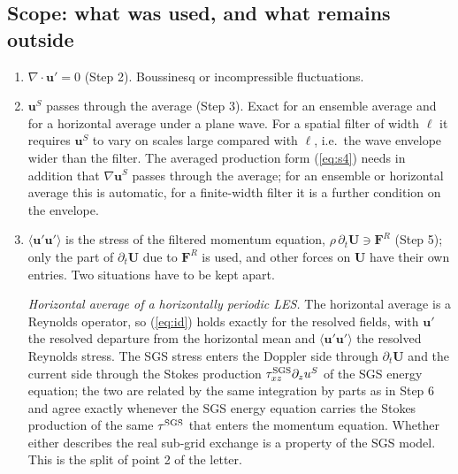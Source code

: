 \documentclass[10pt]{article}
\newcommand{\av}[1]{\langle #1\rangle}\newcommand{\uS}{\bm u^S}\newcommand{\WS}{\mathcal W_S}\newcommand{\PS}{\mathcal P_S}
\newcommand{\bu}{\bm u}\newcommand{\bU}{\bm U}\newcommand{\bxi}{\bm\xi}\newcommand{\dd}{\mathrm d}
\begin{document}
\subsection{Scope: what was used, and what remains outside}\label{sec:scope}
\begin{enumerate}[leftmargin=1.6em,itemsep=1pt,topsep=1pt]
\item $\nabla\cdot\bu'=0$ (Step 2). Boussinesq or incompressible fluctuations.
\item $\uS$ passes through the average (Step 3). Exact for an ensemble average and for a horizontal average under a plane wave. For a spatial filter of width $\ell$ it requires $\uS$ to vary on scales large compared with $\ell$, i.e.\ the wave envelope wider than the filter. The averaged production form (\ref{eq:s4}) needs in addition that $\nabla\uS$ passes through the average; for an ensemble or horizontal average this is automatic, for a finite-width filter it is a further condition on the envelope.
\item $\av{\bu'\bu'}$ is the stress of the filtered momentum equation, $\rho\,\partial_t\bU\ni\bm F^R$ (Step 5); only the part of $\partial_t\bU$ due to $\bm F^R$ is used, and other forces on $\bU$ have their own entries. Two situations have to be kept apart.

\emph{Horizontal average of a horizontally periodic LES.} The horizontal average is a Reynolds operator, so (\ref{eq:id}) holds exactly for the resolved fields, with $\bu'$ the resolved departure from the horizontal mean and $\av{\bu'\bu'}$ the resolved Reynolds stress. The SGS stress enters the Doppler side through $\partial_t\bU$ and the current side through the Stokes production $\tau^{\rm SGS}_{xz}\partial_zu^S$ of the SGS energy equation; the two are related by the same integration by parts as in Step 6 and agree exactly whenever the SGS energy equation carries the Stokes production of the same $\tau^{\rm SGS}$ that enters the momentum equation. Whether either describes the real sub-grid exchange is a property of the SGS model. This is the split of point 2 of the letter.


\end{enumerate}
\end{document}
